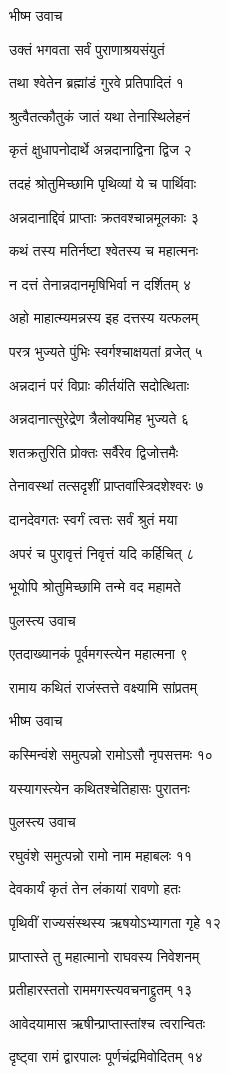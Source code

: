 

भीष्म उवाच

उक्तं भगवता सर्वं पुराणाश्रयसंयुतं

तथा श्वेतेन ब्रह्मांडं गुरवे प्रतिपादितं १

श्रुत्वैतत्कौतुकं जातं यथा तेनास्थिलेहनं

कृतं क्षुधापनोदार्थे अन्नदानाद्विना द्विज २

तदहं श्रोतुमिच्छामि पृथिव्यां ये च पार्थिवाः

अन्नदानाद्दिवं प्राप्ताः क्रतवश्चान्नमूलकाः ३

कथं तस्य मतिर्नष्टा श्वेतस्य च महात्मनः

न दत्तं तेनान्नदानमृषिभिर्वा न दर्शितम् ४

अहो माहात्म्यमन्नस्य इह दत्तस्य यत्फलम्

परत्र भुज्यते पुंभिः स्वर्गश्चाक्षयतां व्रजेत् ५

अन्नदानं परं विप्राः कीर्तयंति सदोत्थिताः

अन्नदानात्सुरेद्रेण त्रैलोक्यमिह भुज्यते ६

शतक्रतुरिति प्रोक्तः सर्वैरेव द्विजोत्तमैः

तेनावस्थां तत्सदृशीं प्राप्तवांस्त्रिदशेश्वरः ७

दानदेवगतः स्वर्गं त्वत्तः सर्वं श्रुतं मया

अपरं च पुरावृत्तं निवृत्तं यदि कर्हिचित् ८

भूयोपि श्रोतुमिच्छामि तन्मे वद महामते

पुलस्त्य उवाच

एतदाख्यानकं पूर्वमगस्त्येन महात्मना ९

रामाय कथितं राजंस्तत्ते वक्ष्यामि सांप्रतम्

भीष्म उवाच

कस्मिन्वंशे समुत्पन्नो रामोऽसौ नृपसत्तमः १०

यस्यागस्त्येन कथितश्चेतिहासः पुरातनः

पुलस्त्य उवाच

रघुवंशे समुत्पन्नो रामो नाम महाबलः ११

देवकार्यं कृतं तेन लंकायां रावणो हतः

पृथिवीं राज्यसंस्थस्य ऋषयोऽभ्यागता गृहे १२

प्राप्तास्ते तु महात्मानो राघवस्य निवेशनम्

प्रतीहारस्ततो राममगस्त्यवचनाद्द्रुतम् १३

आवेदयामास ऋषीन्प्राप्तास्तांश्च त्वरान्वितः

दृष्ट्वा रामं द्वारपालः पूर्णचंद्रमिवोदितम् १४

